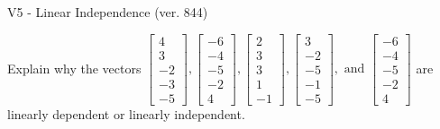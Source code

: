 \begin{exercise}
  \begin{exerciseTitle}V5 - Linear Independence (ver. 844)\end{exerciseTitle}
  \begin{exerciseStatement}
    Explain why the vectors \(\left[\begin{array}{r}
4 \\
3 \\
-2 \\
-3 \\
-5
\end{array}\right] , \left[\begin{array}{r}
-6 \\
-4 \\
-5 \\
-2 \\
4
\end{array}\right] , \left[\begin{array}{r}
2 \\
3 \\
3 \\
1 \\
-1
\end{array}\right] , \left[\begin{array}{r}
3 \\
-2 \\
-5 \\
-1 \\
-5
\end{array}\right] , \text{ and } \left[\begin{array}{r}
-6 \\
-4 \\
-5 \\
-2 \\
4
\end{array}\right]\) are linearly dependent or linearly independent.	



\end{exerciseStatement}
\end{exercise}
